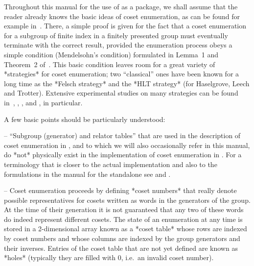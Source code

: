 

Throughout this manual for the use of {\ACE} as a {\GAP}  package,  we
shall assume that the reader already knows the basic  ideas  of  coset
enumeration, as can be found for  example  in~\cite{Neu82}.  There,  a
simple proof is given for the fact that  a  coset  enumeration  for  a
subgroup of finite index in a finitely presented group must eventually
terminate with the correct result, provided  the  enumeration  process
obeys  a  simple  condition  (Mendelsohn's  condition)  formulated  in
Lemma~1 and Theorem~2 of~\cite{Neu82}.  This  basic  condition  leaves
room for a great variety of *strategies* for  coset  enumeration;  two
``classical'' ones have been known for a  long  time  as  the  *Felsch
strategy* and the *HLT strategy* (for Haselgrove, Leech and  Trotter).
Extensive  experimental  studies  on  many  strategies  can  be  found
in~\cite{CDHW73},  \cite{Hav91},  \cite{HR99a},  and  \cite{HR01},  in
particular.

A few basic points should be particularly understood:

\beginlist%

\item{--} ``Subgroup (generator) and relator tables'' that are used in
the description of coset enumeration in \cite{Neu82}, and to which  we
will also occasionally refer in this manual, do *not* physically exist
in  the  implementation  of  coset  enumeration  in  {\ACE}.   For   a
terminology that is closer to the actual implementation  and  also  to
the  formulations  in  the  manual  for  the  {\ACE}  standalone   see
\cite{CDHW73} and \cite{Hav91}.

\item{--} Coset enumeration proceeds by defining *coset numbers*  that
really denote possible representatives for cosets written as words  in
the generators of the group. At the time of their generation it is not
guaranteed that any two of these words do indeed  represent  different
cosets. The state of an  enumeration  at  any  time  is  stored  in  a
2-dimensional array known as a *coset table* whose rows are indexed by
coset numbers and whose columns are indexed by  the  group  generators
and their inverses. Entries of  the  coset  table  that  are  not  yet
defined are known as  *holes*  (typically  they  are  filled  with  0,
i.e.~an invalid coset number).


